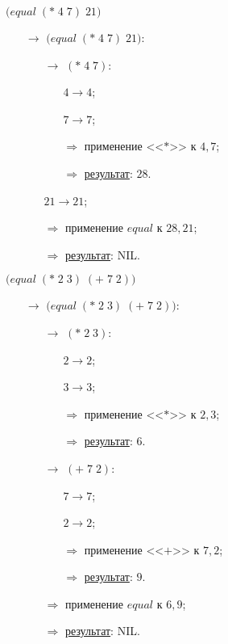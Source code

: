 \problem $\bigl(equal\; (*\; 4\; 7)\; 21\bigr)$

\begin{itemize}
	\item[$\longrightarrow$] $\bigl(equal\; (*\; 4\; 7)\; 21\bigr)$:
	\begin{itemize}
		\item[$\longrightarrow$] $(*\; 4\; 7)$:
		\begin{itemize}
			\item[\textbullet] $4 \to 4$;
			\item[\textbullet] $7 \to 7$;
			\item[$\Longrightarrow$] применение <<$*$>> к $4, 7$;
			\item[$\Longrightarrow$] \underline{результат}: $28$.
		\end{itemize}
		\item[\textbullet] $21 \to 21$;
		\item[$\Longrightarrow$] применение $equal$ к $28, 21$;
		\item[$\Longrightarrow$] \underline{результат}: NIL.
	\end{itemize}
\end{itemize}


\newpage
\problem $\bigl(equal\; (*\; 2\; 3)\; (+\; 7\; 2) \bigr)$

\begin{itemize}
	\item[$\longrightarrow$] $\bigl(equal\; (*\; 2\; 3)\; (+\; 7\; 2) \bigr)$:
	\begin{itemize}
		\item[$\longrightarrow$] $(*\; 2\; 3)$:
		\begin{itemize}
			\item[\textbullet] $2 \to 2$;
			\item[\textbullet] $3 \to 3$;
			\item[$\Longrightarrow$] применение <<$*$>> к $2, 3$;
			\item[$\Longrightarrow$] \underline{результат}: $6$.
		\end{itemize}
		\item[$\longrightarrow$] $(+\; 7\; 2)$:
		\begin{itemize}
			\item[\textbullet] $7 \to 7$;
			\item[\textbullet] $2 \to 2$;
			\item[$\Longrightarrow$] применение <<$+$>> к $7, 2$;
			\item[$\Longrightarrow$] \underline{результат}: $9$.
		\end{itemize}
		\item[$\Longrightarrow$] применение $equal$ к $6, 9$;
		\item[$\Longrightarrow$] \underline{результат}: NIL.
	\end{itemize}
\end{itemize}


